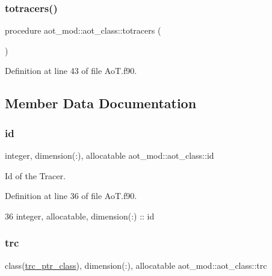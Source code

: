 \subsubsection{\texorpdfstring{totracers()}{totracers()}}
{\footnotesize\ttfamily procedure aot\+\_\+mod\+::aot\+\_\+class\+::totracers (\begin{DoxyParamCaption}{ }\end{DoxyParamCaption})\hspace{0.3cm}{\ttfamily [private]}}



Definition at line 43 of file Ao\+T.\+f90.



\subsection{Member Data Documentation}
\mbox{\label{structaot__mod_1_1aot__class_ad4bc41c8c0f5dc4ade794eae2d2d5cd5}} 
\subsubsection{\texorpdfstring{id}{id}}
{\footnotesize\ttfamily integer, dimension(\+:), allocatable aot\+\_\+mod\+::aot\+\_\+class\+::id\hspace{0.3cm}{\ttfamily [private]}}



Id of the Tracer. 



Definition at line 36 of file Ao\+T.\+f90.


\begin{DoxyCode}
36         \textcolor{keywordtype}{integer}, \textcolor{keywordtype}{allocatable}, \textcolor{keywordtype}{dimension(:)} :: id
\end{DoxyCode}
\mbox{\label{structaot__mod_1_1aot__class_a9f05f9f23b3850d0e79a62d139a633c2}} 
\subsubsection{\texorpdfstring{trc}{trc}}
{\footnotesize\ttfamily class(\mbox{\hyperlink{structaot__mod_1_1trc__ptr__class}{trc\+\_\+ptr\+\_\+class}}), dimension(\+:), allocatable aot\+\_\+mod\+::aot\+\_\+class\+::trc\hspace{0.3cm}{\ttfamily [private]}}



